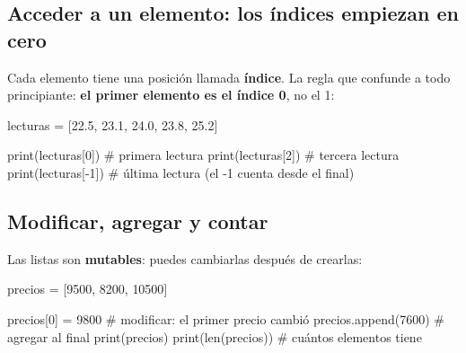 \documentclass[
  spanish,
  letterpaper,
  DIV=11,
  numbers=noendperiod]{scrreprt}
\newenvironment{Shaded}{\begin{snugshade}}{\end{snugshade}}
\newcommand{\BuiltInTok}[1]{\textcolor[rgb]{0.00,0.23,0.31}{#1}}
\newcommand{\CommentTok}[1]{\textcolor[rgb]{0.37,0.37,0.37}{#1}}
\newcommand{\DecValTok}[1]{\textcolor[rgb]{0.68,0.00,0.00}{#1}}
\newcommand{\FloatTok}[1]{\textcolor[rgb]{0.68,0.00,0.00}{#1}}
\newcommand{\NormalTok}[1]{\textcolor[rgb]{0.00,0.23,0.31}{#1}}
\newcommand{\OperatorTok}[1]{\textcolor[rgb]{0.37,0.37,0.37}{#1}}
\begin{document}
\subsection{Acceder a un elemento: los índices empiezan en
cero}\label{acceder-a-un-elemento-los-uxedndices-empiezan-en-cero}

Cada elemento tiene una posición llamada \textbf{índice}. La regla que
confunde a todo principiante: \textbf{el primer elemento es el índice
0}, no el 1:

\begin{Shaded}
\begin{Highlighting}[]
\NormalTok{lecturas }\OperatorTok{=}\NormalTok{ [}\FloatTok{22.5}\NormalTok{, }\FloatTok{23.1}\NormalTok{, }\FloatTok{24.0}\NormalTok{, }\FloatTok{23.8}\NormalTok{, }\FloatTok{25.2}\NormalTok{]}

\BuiltInTok{print}\NormalTok{(lecturas[}\DecValTok{0}\NormalTok{])   }\CommentTok{\# primera lectura}
\BuiltInTok{print}\NormalTok{(lecturas[}\DecValTok{2}\NormalTok{])   }\CommentTok{\# tercera lectura}
\BuiltInTok{print}\NormalTok{(lecturas[}\OperatorTok{{-}}\DecValTok{1}\NormalTok{])  }\CommentTok{\# última lectura (el {-}1 cuenta desde el final)}
\end{Highlighting}
\end{Shaded}

\subsection{Modificar, agregar y
contar}\label{modificar-agregar-y-contar}

Las listas son \textbf{mutables}: puedes cambiarlas después de crearlas:

\begin{Shaded}
\begin{Highlighting}[]
\NormalTok{precios }\OperatorTok{=}\NormalTok{ [}\DecValTok{9500}\NormalTok{, }\DecValTok{8200}\NormalTok{, }\DecValTok{10500}\NormalTok{]}

\NormalTok{precios[}\DecValTok{0}\NormalTok{] }\OperatorTok{=} \DecValTok{9800}        \CommentTok{\# modificar: el primer precio cambió}
\NormalTok{precios.append(}\DecValTok{7600}\NormalTok{)     }\CommentTok{\# agregar al final}
\BuiltInTok{print}\NormalTok{(precios)}
\BuiltInTok{print}\NormalTok{(}\BuiltInTok{len}\NormalTok{(precios))      }\CommentTok{\# cuántos elementos tiene}
\end{Highlighting}
\end{Shaded}
\end{document}
